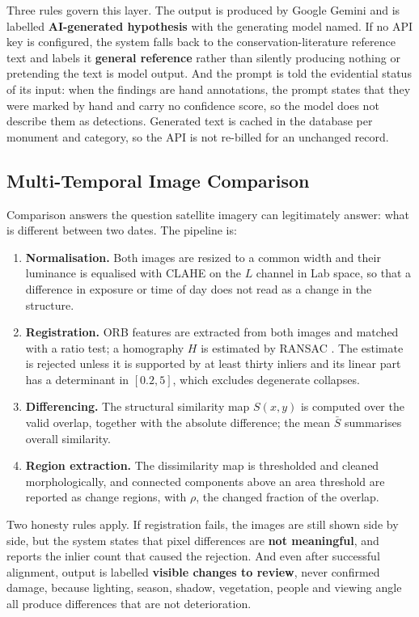\documentclass[a4paper,12pt,oneside]{book}
\begin{document}
Three rules govern this layer. The output is produced by Google Gemini \cite{gemini2024} and is labelled \textbf{AI-generated hypothesis} with the generating model named. If no API key is configured, the system falls back to the conservation-literature reference text and labels it \textbf{general reference} rather than silently producing nothing or pretending the text is model output. And the prompt is told the evidential status of its input: when the findings are hand annotations, the prompt states that they were marked by hand and carry no confidence score, so the model does not describe them as detections. Generated text is cached in the database per monument and category, so the API is not re-billed for an unchanged record.

\subsection{Multi-Temporal Image Comparison}
Comparison answers the question satellite imagery can legitimately answer: what is different between two dates. The pipeline is:

\begin{enumerate}
    \item \textbf{Normalisation.} Both images are resized to a common width and their luminance is equalised with CLAHE \cite{zuiderveld1994clahe} on the $L$ channel in Lab space, so that a difference in exposure or time of day does not read as a change in the structure.
    \item \textbf{Registration.} ORB features \cite{rublee2011orb} are extracted from both images and matched with a ratio test; a homography $H$ is estimated by RANSAC \cite{fischler1981ransac}. The estimate is rejected unless it is supported by at least thirty inliers and its linear part has a determinant in $[0.2, 5]$, which excludes degenerate collapses.
    \item \textbf{Differencing.} The structural similarity map $S(x,y)$ \cite{wang2004ssim} is computed over the valid overlap, together with the absolute difference; the mean $\bar{S}$ summarises overall similarity.
    \item \textbf{Region extraction.} The dissimilarity map is thresholded and cleaned morphologically, and connected components above an area threshold are reported as change regions, with $\rho$, the changed fraction of the overlap.
\end{enumerate}

Two honesty rules apply. If registration fails, the images are still shown side by side, but the system states that pixel differences are \textbf{not meaningful}, and reports the inlier count that caused the rejection. And even after successful alignment, output is labelled \textbf{visible changes to review}, never confirmed damage, because lighting, season, shadow, vegetation, people and viewing angle all produce differences that are not deterioration.
\end{document}
